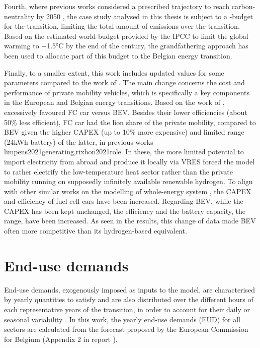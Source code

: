 Fourth, where previous works considered a prescribed  trajectory to reach carbon-neutrality by 2050 \cite{limpens2021generating, limpens2024pathway}, the case study analysed in this thesis is subject to a -budget for the transition, \ie limiting the total amount of emissions over the transition. Based on the estimated world budget provided by the \gls{IPCC} to limit the global warming to +1.5°C by the end of the century, the grandfathering approach has been used to allocate part of this budget to the Belgian energy transition.

Finally, to a smaller extent, this work includes updated values for some parameters compared to the work of \citet{limpens2021generating}. The main change concerns the cost and performance of private mobility vehicles, which is specifically a key components in the European \cite{biresselioglu2018electric} and Belgian \cite{BFP_mob} energy transitions. Based on the work of \citet{national2013transitions}, \citet{limpens2021generating} excessively favoured \gls{FC} car versus \gls{BEV}. Besides their lower efficiencies (\ie about 50\% less efficient), \gls{FC} car had the lion share of the private mobility, compared to \gls{BEV} given the higher CAPEX (\ie up to 10\% more expensive) and limited range (\ie 24kWh battery) of the latter, in previous works \gls{limpens2021generating,rixhon2021role}. In these, the more limited potential to import electricity from abroad and produce it locally via \gls{VRES} forced the model to rather electrify the low-temperature heat sector rather than the private mobility running on supposedly infinitely available renewable hydrogen. To align with other similar works on the modelling of whole-energy system \cite{schnidrig2021modelling, EuropeanCommission2021}, the CAPEX and efficiency of fuel cell cars have been increased. Regarding \gls{BEV}, while the CAPEX has been kept unchanged, the efficiency and the battery capacity, \ie the range, have been increased. As seen in the results, this change of data made \gls{BEV} often more competitive than its hydrogen-based equivalent. 

\section{End-use demands}
\label{sec:cs:demand}
End-use demands, exogenously imposed as inputs to the model, are characterised by yearly quantities to satisfy and are also distributed over the different hours of each representative years of the transition, in order to account for their daily or seasonal variability \cite{Limpens2020,limpens2021generating}. In this work, the yearly end-use demands (EUD) for all sectors are calculated from the forecast proposed by the European Commission for Belgium (Appendix 2 in report \cite{EuropeanCommission2021}). 

